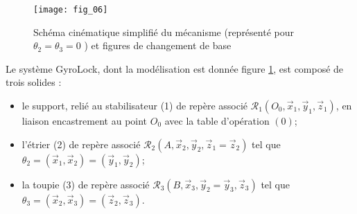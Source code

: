 \begin{figure}[!h]
\centering
\texttt{[image: fig\_06]}
\caption{\label{fig:06}Schéma cinématique simplifié du mécanisme (représenté pour $\theta_{2}=\theta_{3}=0$ ) et figures de changement de base}
\end{figure}


Le système GyroLock, dont la modélisation est donnée figure \ref{fig:06}, est composé de trois solides :

\begin{itemize}
  \item le support, relié au stabilisateur (1) de repère associé $\mathcal{R}_{1}\left(O_{0}, \vec{x}_{1}, \vec{y}_{1}, \vec{z}_{1}\right)$, en liaison encastrement au point $O_{0}$ avec la table d'opération $(0)$;

  \item l'étrier (2) de repère associé $\mathcal{R}_{2}\left(A, \vec{x}_{2}, \vec{y}_{2}, \vec{z}_{1}=\vec{z}_{2}\right)$ tel que $\theta_{2}=\left(\vec{x}_{1}, \vec{x}_{2}\right)=\left(\vec{y}_{1}, \vec{y}_{2}\right)$;

  \item la toupie (3) de repère associé $\mathcal{R}_{3}\left(B, \vec{x}_{3}, \vec{y}_{2}=\vec{y}_{3}, \vec{z}_{3}\right)$ tel que $\theta_{3}=\left(\vec{x}_{2}, \vec{x}_{3}\right)=\left(\vec{z}_{2}, \vec{z}_{3}\right)$.

\end{itemize}

